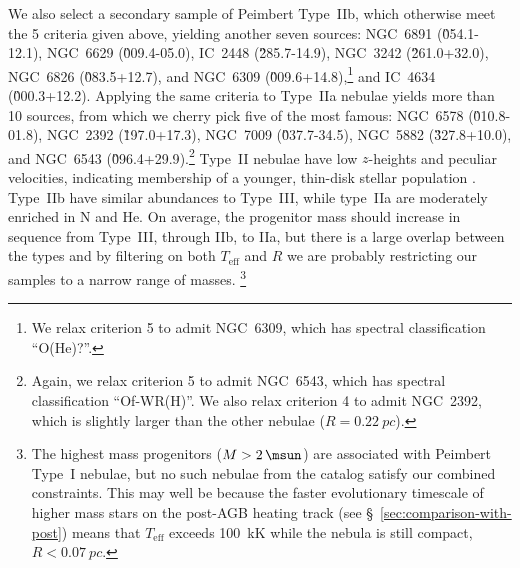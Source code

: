 \documentclass[useAMS, usenatbib]{mnras}
\newcommand{\teff}{\ensuremath{T_\mathrm{eff}}}
\begin{document}
We also select a secondary sample of Peimbert Type~IIb,
which otherwise meet the 5 criteria given above,
yielding another seven sources:
NGC~6891 (\G{054.1}{-12.1}),
NGC~6629 (\G{009.4}{-05.0}),
IC~2448 (\G{285.7}{-14.9}), 
NGC~3242 (\G{261.0}{+32.0}), 
NGC~6826 (\G{083.5}{+12.7}),
and NGC~6309 (\G{009.6}{+14.8}),\footnote{
  We relax criterion 5 to admit NGC~6309, which has spectral classification ``O(He)?''.  
}
and IC~4634 (\G{000.3}{+12.2}).
Applying the same criteria to Type~IIa nebulae yields more than 10 sources,
from which we cherry pick five of the most famous:
NGC~6578 (\G{010.8}{-01.8}), 
NGC~2392 (\G{197.0}{+17.3}), 
NGC~7009 (\G{037.7}{-34.5}), 
NGC~5882 (\G{327.8}{+10.0}), 
and NGC~6543 (\G{096.4}{+29.9}).\footnote{
  Again, we relax criterion 5 to admit NGC~6543, which has spectral classification ``Of-WR(H)''.
  We also relax criterion 4 to admit NGC~2392, which is slightly larger than the other nebulae (\(R = \SI{0.22}{pc}\)).
} 
Type~II nebulae 
have low \(z\)-heights and peculiar velocities,
indicating membership of a younger, thin-disk stellar population \citep{Quireza:2007a}.
Type~IIb have similar abundances to Type~III,
while type~IIa are moderately enriched in N and He. 
On average, the progenitor mass should increase in sequence from Type~III,
through IIb, to IIa,
but there is a large overlap between the types \citep{Stanghellini:2018a}
and by filtering on both \teff{} and \(R\) we are probably restricting our samples to a narrow range of masses.%
\footnote{
  The highest mass progenitors (\(M > \SI{2}{\msun}\)) are associated with Peimbert Type~I nebulae,
  but no such nebulae from the \citet{Quireza:2007a} catalog satisfy our combined constraints.
  This may well be because the faster evolutionary timescale of higher mass stars on the post-AGB heating track
  (see \S~\ref{sec:comparison-with-post})
  means that \teff{} exceeds \SI{100}{kK} while the nebula is still compact,
  \(R < \SI{0.07}{pc}\).
}
\end{document}
